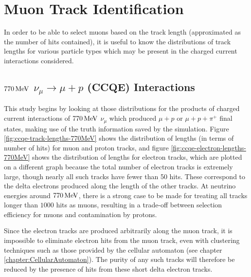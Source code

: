 \section{Muon Track Identification}
In order to be able to select muons based on the track length (approximated as the number of hits contained), it is useful to know the distributions of track lengths for various particle types which may be present in the charged current interactions considered. 

\subsection{$770\,\mathrm{MeV}$ $\nu_\mu \rightarrow \mu + p$ (CCQE) Interactions}
This study begins by looking at those distributions for the products of charged current interactions of $770\,\mathrm{MeV}$ $\nu_\mu$ which produced $\mu + p$ or $\mu + p + \pi^+$ final states, making use of the truth information saved by the simulation. Figure \ref{fig:ccqe-track-lengths-770MeV} shows the distribution of lengths (in terms of number of hits) for muon and proton tracks, and figure \ref{fig:ccqe-electron-lengths-770MeV} shows the distribution of lengths for electron tracks, which are plotted on a different graph because the total number of electron tracks is extremely large, though nearly all such tracks have fewer than 50 hits. These correspond to the delta electrons produced along the length of the other tracks. At neutrino energies around $770\,\mathrm{MeV}$, there is a strong case to be made for treating all tracks longer than $1000$ hits as muons, resulting in a trade-off between selection efficiency for muons and contamination by protons.

Since the electron tracks are produced arbitrarily along the muon track, it is impossible to eliminate electron hits from the muon track, even with clustering techniques such as those provided by the cellular automaton (see chapter \ref{chapter:CellularAutomaton}). The purity of any such tracks will therefore be reduced by the presence of hits from these short delta electron tracks.

